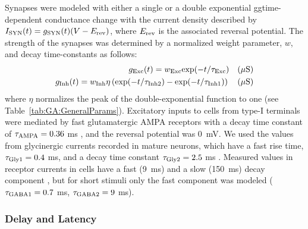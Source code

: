 Synapses were modeled with either a single or a double exponential
ggtime-dependent conductance change with the current density described
by $I_{{\rm SYN}} (t)=g_{{\rm SYN}} (t)(V-E_{{\rm rev}} )$, where
$E_{\rm rev}$ is the associated reversal potential. The strength of
the synapses was determined by a normalized weight parameter, $w$, and
decay time-constants as follows:
\begin{eqnarray}
  \label{eq:GA:11}
  g_{{\rm Exc}} (t)=w_{{\rm Exc}} {\rm exp}(-t/\tau _{{\rm Exc}} ) \quad (\mu\mathrm{S}) \\
  \label{eq:GA:12} g_{{\rm Inh}} (t)=w_{{\rm Inh}} \eta \left({\rm exp}(-t/\tau_{{\rm Inh2}} )-{\rm exp}(-t/\tau _{{\rm Inh1}} )\right) \quad (\mu\mathrm{S}) 
\end{eqnarray}
\noindent where $\eta$ normalizes the peak of the double-exponential
function to one (see Table~\ref{tab:GA:GeneralParams}). Excitatory
inputs to {\CN} cells from type-I {\ANF} terminals were mediated by fast
glutamatergic AMPA receptors with a decay time constant of $\tau
_{{\rm AMPA}} = 0.36$ ms
\citep{Gardner:2000,GardnerTrussellEtAl:1999}, and the reversal
potential was 0~mV. We used the values from glycinergic currents
recorded in mature {\CN} neurons, which have a fast rise time, $\tau_{{\rm Gly1}} = 0.4$ ms, and a decay time constant $\tau_{{\rm Gly2}}
= 2.5$ ms
\citep{AwatramaniTurecekEtAl:2005,HartyManis:1998,LeaoOleskevichEtAl:2004,LimOleskevichEtAl:2003}.
Measured values in \GABAa receptor currents in {\CN} cells have a fast
(9~ms) and a slow (150~ms) decay component
\citep{AwatramaniTurecekEtAl:2005,DavisYoung:2000}, but for short
stimuli only the fast component was modeled ($\tau_{{\rm GABA1}}
=0.7$ ms, $\tau_{{\rm GABA2}} =9$ ms).

\subsubsection{Delay and Latency}

